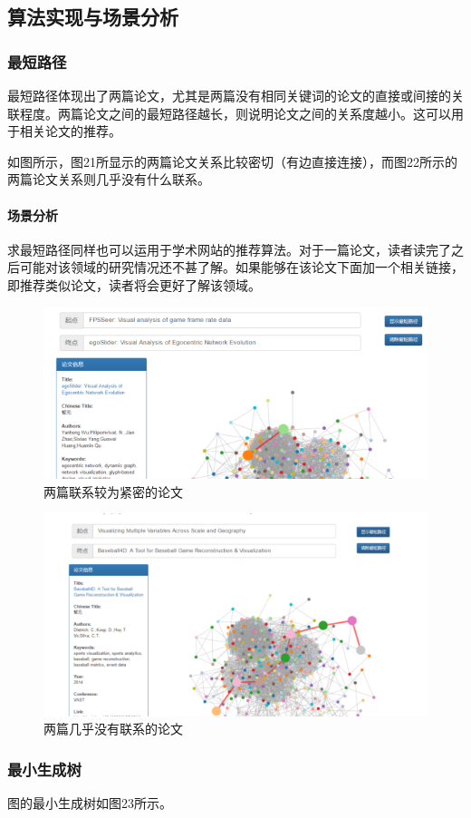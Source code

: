 \documentclass[UTF8, onecolumn, a4paper]{article}
\begin{document}
\subsection{算法实现与场景分析}
\subsubsection{最短路径}
    最短路径体现出了两篇论文，尤其是两篇没有相同关键词的论文的直接或间接的关联程度。两篇论文之间的最短路径越长，则说明论文之间的关系度越小。这可以用于相关论文的推荐。
    
    如图所示，图21所显示的两篇论文关系比较密切（有边直接连接），而图22所示的两篇论文关系则几乎没有什么联系。

    \paragraph{场景分析}求最短路径同样也可以运用于学术网站的推荐算法。对于一篇论文，读者读完了之后可能对该领域的研究情况还不甚了解。如果能够在该论文下面加一个相关链接，即推荐类似论文，读者将会更好了解该领域。
\begin{figure}[H]
	\centering
	\includegraphics[width=0.6\linewidth]{../pictures/show16}
	\caption{两篇联系较为紧密的论文}
\end{figure}
\begin{figure}[H]
	\centering
	\includegraphics[width=0.6\linewidth]{../pictures/show17}
	\caption{两篇几乎没有联系的论文}
\end{figure}
\subsubsection{最小生成树}
    图的最小生成树如图23所示。
  
\end{document}
